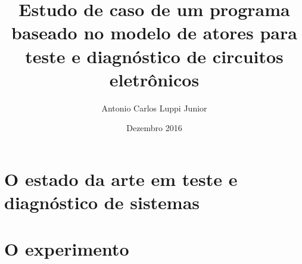 \documentclass{ufsc-thesis}
\title{Estudo de caso de um programa baseado no modelo de atores para teste e diagnóstico de circuitos eletrônicos}
\author{Antonio Carlos Luppi Junior}
\date{Dezembro 2016}
\begin{document}
\frontmatter
\imprimircapa
\imprimirfolhaderosto

    
  \mainmatter
        \setcounter{page}{1}
    
\part{O estado da arte em teste e diagnóstico de sistemas}
    
\part{O experimento}
    
    
    
\postextual

%



\end{document}
